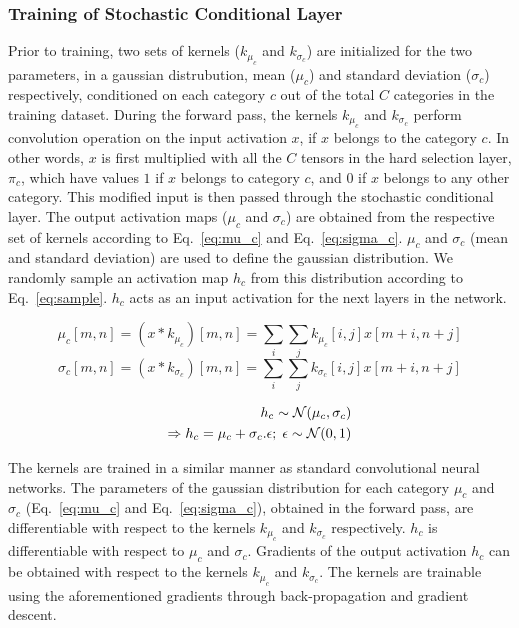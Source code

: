 \documentclass[12pt, letterpaper]{article}
\begin{document}
\subsubsection{Training of Stochastic Conditional Layer}
Prior to training, two sets of kernels ($k_{\mu_c}$ and $k_{\sigma_c}$) are initialized for the two parameters, in a gaussian distrubution, mean ($\mu_c$) and standard deviation ($\sigma_c$) respectively, conditioned on each category $c$ out of the total $C$ categories in the training dataset. During the forward pass, the kernels $k_{\mu_c}$ and $k_{\sigma_c}$ perform convolution operation on the input activation $x$, if $x$ belongs to the category $c$. In other words, $x$ is first multiplied with all the $C$ tensors in the hard selection layer, $\pi_c$, which have values $1$ if $x$ belongs to category $c$, and $0$ if $x$ belongs to any other category. This modified input is then passed through the stochastic conditional layer. The output activation maps ($\mu_c$ and $\sigma_c$) are obtained from the respective set of kernels according to Eq.~\eqref{eq:mu_c} and Eq.~\eqref{eq:sigma_c}. $\mu_c$ and $\sigma_c$ (mean and standard deviation) are used to define the gaussian distribution. We randomly sample an activation map  $h_c$ from this distribution according to Eq.~\eqref{eq:sample}. $h_c$ acts as an input activation for the next layers in the network. 

\begin{equation}
  \mu_c[m,n]=(x * k_{\mu_c})[m,n]=\sum_i \sum_j k_{\mu_c}[i,j]x[m+i,n+j]
  \label{eq:mu_c}
\end{equation}
\begin{equation}
  \sigma_c[m,n]=(x * k_{\sigma_c})[m,n]=\sum_i \sum_j k_{\sigma_c}[i,j]x[m+i,n+j]
  \label{eq:sigma_c}
\end{equation}

\begin{align}
  h_\mathrm{c} \sim \mathcal{N}(\mu_c,\sigma_c) \notag\\
  \Rightarrow h_c=\mu_c + \sigma_c.\epsilon;\; \epsilon \sim \mathcal{N}(0,1)
  \label{eq:sample}
\end{align}

The kernels are trained in a similar manner as standard convolutional neural networks. The parameters of the gaussian distribution for each category $\mu_c$ and $\sigma_c$ (Eq.~\eqref{eq:mu_c} and Eq.~\eqref{eq:sigma_c}), obtained in the forward pass, are differentiable with respect to the kernels $k_{\mu_c}$ and $k_{\sigma_c}$ respectively. $h_c$ is differentiable with respect to $\mu_c$ and $\sigma_c$. Gradients of the output activation $h_c$ can be obtained with respect to the kernels  $k_{\mu_c}$ and $k_{\sigma_c}$. The kernels are trainable using the aforementioned gradients through back-propagation and gradient descent. 
\end{document}
